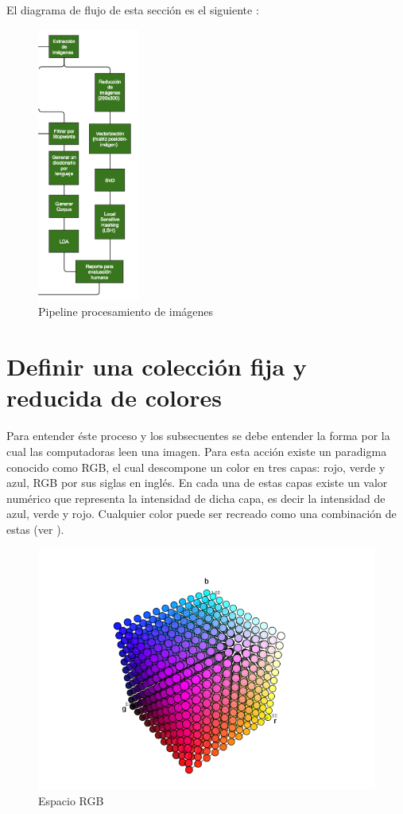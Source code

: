 El diagrama de flujo de esta sección es el siguiente : 

\begin{figure}[H]
\centering
\includegraphics[width=0.3\textwidth]{Figures/pipeline_itam.png}
\caption{Pipeline procesamiento de imágenes}
\end{figure}


\section{Definir una colección fija y reducida de colores}

Para entender éste proceso y los subsecuentes se debe entender la forma por la cual las computadoras leen una imagen. Para esta acción existe un paradigma conocido como RGB, el cual descompone un color en tres capas: rojo, verde y azul, RGB por sus siglas en inglés. En cada una de estas capas existe un valor numérico que representa la intensidad de dicha capa, es decir la intensidad de azul, verde y rojo.  Cualquier color puede ser recreado como una combinación de estas (ver \cite{susstrunk1999standard}).


\begin{figure}[H]
\centering
\includegraphics[width=1\textwidth]{Figures/cubo.png}
\caption{Espacio RGB}
\label{fig:cubo-rgb}
\end{figure}

